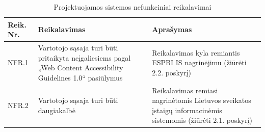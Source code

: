 \begin{table}[!ht]
    \centering
    \renewcommand{\arraystretch}{1.2}
    \renewcommand\thetable{6}
    \caption{Projektuojamos sistemos nefunkciniai reikalavimai} 

    \begin{tabular}{|m{3em}|m{17em}|m{17em}|}
    \hline 
    \rowcolor[HTML]{EFEFEF} 
    Reik. Nr. & Reikalavimas & Aprašymas \\ \hline

    NFR.1  &  Vartotojo sąsaja turi būti pritaikyta neįgaliesiems pagal „Web Content Accessibility Guidelines 1.0“ pasiūlymus  &  Reikalavimas kyla remiantis ESPBI IS nagrinėjimu (žiūrėti 2.2. poskyrį)       \\ \hline
    NFR.2  &  Vartotojo sąsaja turi būti daugiakalbė &  Reikalavimas remiasi nagrinėtomis Lietuvos sveikatos įstaigų informacinėmis sistemomis (žiūrėti 2.1. poskyrį)       \\ \hline


    \end{tabular}

\end{table}


